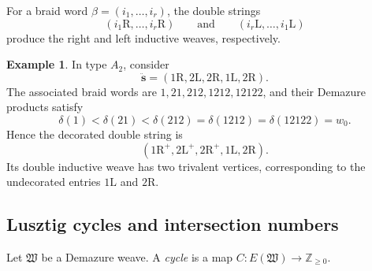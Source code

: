 \documentclass[12pt, reqno]{amsart}
\theoremstyle{plain}
\theoremstyle{definition}
\newtheorem{example}[theorem]{Example}
\numberwithin{equation}{section}
\newcommand{\ZZ}{\mathbb{Z}}
\begin{document}
For a braid word \(\beta=(i_1,\ldots,i_r)\), the double strings
\begin{equation*}
    (i_1\mathrm R,\ldots,i_r\mathrm R)
    \qquad\text{and}\qquad
    (i_r\mathrm L,\ldots,i_1\mathrm L)
\end{equation*}
produce the right and left inductive weaves, respectively.

\begin{example}\label{ex:double-inductive-weave-A2}
    In type \(A_2\), consider
    \begin{equation*}
        \ddot{\mathbf{s}}
        =(1\mathrm R,2\mathrm L,2\mathrm R,
          1\mathrm L,2\mathrm R).
    \end{equation*}
    The associated braid words are
    \(1,21,212,1212,12122\), and their Demazure products satisfy
    \begin{equation*}
        \delta(1)<\delta(21)<\delta(212)
        =\delta(1212)=\delta(12122)=w_0.
    \end{equation*}
    Hence the decorated double string is
    \begin{equation*}
        (1\mathrm R^+,2\mathrm L^+,2\mathrm R^+,
         1\mathrm L,2\mathrm R).
    \end{equation*}
    Its double inductive weave has two trivalent vertices, corresponding
    to the undecorated entries \(1\mathrm L\) and \(2\mathrm R\).
\end{example}

\subsection{Lusztig cycles and intersection numbers}

Let \(\mathfrak W\) be a Demazure weave. A \emph{cycle} is a map
\(C\colon E(\mathfrak W)\to\ZZ_{\geq0}\).
\end{document}
